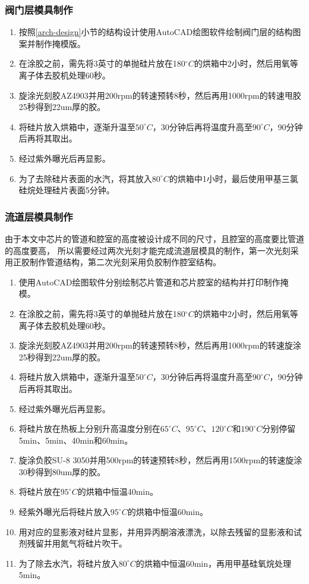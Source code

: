 \subsubsection{阀门层模具制作}
	
	\begin{enumerate}[label={(\arabic*)},font={\color{black!50!black}\bfseries}]
	\item 按照\ref{arch-design}小节的结构设计使用AutoCAD绘图软件绘制阀门层的结构图案并制作掩模版。
	\item 在涂胶之前，需先将3英寸的单抛硅片放在180$^\circ C$的烘箱中2小时，然后用氧等离子体去胶机处理60秒。
	\item 旋涂光刻胶AZ4903并用200rpm的转速预转8秒，然后再用1000rpm的转速甩胶25秒得到22um厚的胶。
	\item 将硅片放入烘箱中，逐渐升温至$50^\circ C$，30分钟后再将温度升高至$90^\circ C$，90分钟后再将其取出。
	\item 经过紫外曝光后再显影。
	\item 为了去除硅片表面的水汽，将其放入$80^\circ C$的烘箱中1小时，最后使用甲基三氯硅烷处理硅片表面5分钟。
	\end{enumerate}
	
\subsubsection{流道层模具制作}
	由于本文中芯片的管道和腔室的高度被设计成不同的尺寸，且腔室的高度要比管道的高度要高，
	所以需要经过两次光刻才能完成流道层模具的制作，第一次光刻采用正胶制作管道结构，第二次光刻采用负胶制作腔室结构。
	\begin{enumerate}[label={(\arabic*)},font={\color{black!50!black}\bfseries}]
	\item 使用AutoCAD绘图软件分别绘制芯片管道和芯片腔室的结构并打印制作掩模。
	\item 在涂胶之前，需先将3英寸的单抛硅片放在180$^\circ C$的烘箱中2小时，然后用氧等离子体去胶机处理60秒。
	\item 旋涂光刻胶AZ4903并用200rpm的转速预转8秒，然后再用1000rpm的转速旋涂25秒得到22um厚的胶。
	\item 将硅片放入烘箱中，逐渐升温至$50^\circ C$，30分钟后再将温度升高至$90^\circ C$，90分钟后再将其取出。
	\item 经过紫外曝光后再显影。
	\item 将硅片放在热板上分别升高温度分别在$65^\circ C$、$95^\circ C$、$120^\circ C$和$190^\circ C$分别停留
	5min、5min、40min和60min。
	\item 旋涂负胶SU-8 3050并用500rpm的转速预转8秒，然后再用1500rpm的转速旋涂30秒得到80um厚的胶。
	\item 将硅片放在$95^\circ C$的烘箱中恒温40min。
	\item 经紫外曝光后将硅片放入$95^\circ C$的烘箱中恒温60min。
	\item 用对应的显影液对硅片显影，并用异丙酮溶液漂洗，以除去残留的显影液和试剂残留并用氮气将硅片吹干。
	\item 为了除去水汽，将硅片放入$80^\circ C$的烘箱中恒温60min，再用甲基硅氧烷处理5min。
	\end{enumerate}
